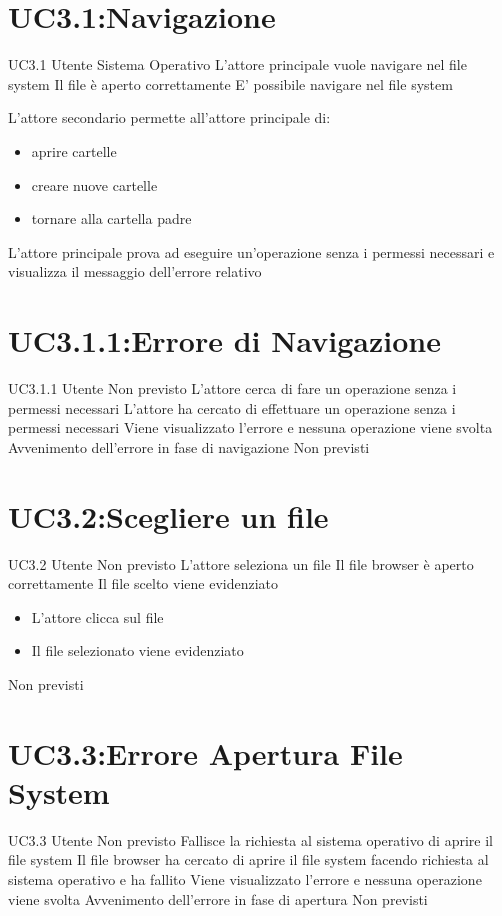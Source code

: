 \documentclass[../AnalisideiRequisiti.tex]{subfiles}
\begin{document}
	\section{UC3.1:Navigazione}
	\UserCase
	{UC3.1}
	{Utente}
	{Sistema Operativo}
	{L'attore principale vuole navigare nel file system}
	{Il file  è aperto correttamente}
	{E' possibile navigare nel file system}
	{
		L'attore secondario permette all'attore principale di:
		\begin{itemize}
			\item{} aprire cartelle
			\item{} creare nuove cartelle
			\item{} tornare alla cartella padre
		\end{itemize}
	}
	{L'attore principale prova ad eseguire un'operazione senza i permessi necessari e visualizza il messaggio dell'errore relativo }	
	
	\section{UC3.1.1:Errore di Navigazione}
	\UserCase
	{UC3.1.1}
	{Utente}
	{Non previsto}
	{L'attore cerca di fare un operazione senza i permessi necessari}
	{L'attore ha cercato di effettuare un operazione senza i permessi necessari}
	{Viene visualizzato l'errore e nessuna operazione viene svolta}
	{Avvenimento dell'errore in fase di navigazione}
	{Non previsti}

	\section{UC3.2:Scegliere un file}
\UserCase
{UC3.2}
{Utente}
{Non previsto}
{L'attore seleziona un file}
{Il file browser è aperto correttamente}
{Il file scelto viene evidenziato}
{
	\begin{itemize}
		\item{} L'attore clicca sul file
		\item{} Il file selezionato viene evidenziato
	\end{itemize}
}
{Non previsti}

\section{UC3.3:Errore Apertura File System}
\UserCase
{UC3.3}
{Utente}
{Non previsto}
{Fallisce la richiesta al sistema operativo di aprire il file system}
{Il file browser ha cercato di aprire il file system facendo richiesta al sistema operativo e ha fallito}
{Viene visualizzato l'errore e nessuna operazione viene svolta}
{Avvenimento dell'errore in fase di apertura}
{Non previsti}
\end{document}
